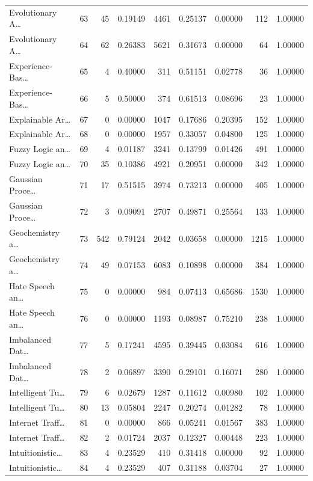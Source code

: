 \begin{table}
\begin{tabular}{lrrrrrrrr}
Evolutionary A… & 63 & 45 & 0.19149 & 4461 & 0.25137 & 0.00000 & 112 & 1.00000 \\
Evolutionary A… & 64 & 62 & 0.26383 & 5621 & 0.31673 & 0.00000 & 64 & 1.00000 \\
Experience-Bas… & 65 & 4 & 0.40000 & 311 & 0.51151 & 0.02778 & 36 & 1.00000 \\
Experience-Bas… & 66 & 5 & 0.50000 & 374 & 0.61513 & 0.08696 & 23 & 1.00000 \\
Explainable Ar… & 67 & 0 & 0.00000 & 1047 & 0.17686 & 0.20395 & 152 & 1.00000 \\
Explainable Ar… & 68 & 0 & 0.00000 & 1957 & 0.33057 & 0.04800 & 125 & 1.00000 \\
Fuzzy Logic an… & 69 & 4 & 0.01187 & 3241 & 0.13799 & 0.01426 & 491 & 1.00000 \\
Fuzzy Logic an… & 70 & 35 & 0.10386 & 4921 & 0.20951 & 0.00000 & 342 & 1.00000 \\
Gaussian Proce… & 71 & 17 & 0.51515 & 3974 & 0.73213 & 0.00000 & 405 & 1.00000 \\
Gaussian Proce… & 72 & 3 & 0.09091 & 2707 & 0.49871 & 0.25564 & 133 & 1.00000 \\
Geochemistry a… & 73 & 542 & 0.79124 & 2042 & 0.03658 & 0.00000 & 1215 & 1.00000 \\
Geochemistry a… & 74 & 49 & 0.07153 & 6083 & 0.10898 & 0.00000 & 384 & 1.00000 \\
Hate Speech an… & 75 & 0 & 0.00000 & 984 & 0.07413 & 0.65686 & 1530 & 1.00000 \\
Hate Speech an… & 76 & 0 & 0.00000 & 1193 & 0.08987 & 0.75210 & 238 & 1.00000 \\
Imbalanced Dat… & 77 & 5 & 0.17241 & 4595 & 0.39445 & 0.03084 & 616 & 1.00000 \\
Imbalanced Dat… & 78 & 2 & 0.06897 & 3390 & 0.29101 & 0.16071 & 280 & 1.00000 \\
Intelligent Tu… & 79 & 6 & 0.02679 & 1287 & 0.11612 & 0.00980 & 102 & 1.00000 \\
Intelligent Tu… & 80 & 13 & 0.05804 & 2247 & 0.20274 & 0.01282 & 78 & 1.00000 \\
Internet Traff… & 81 & 0 & 0.00000 & 866 & 0.05241 & 0.01567 & 383 & 1.00000 \\
Internet Traff… & 82 & 2 & 0.01724 & 2037 & 0.12327 & 0.00448 & 223 & 1.00000 \\
Intuitionistic… & 83 & 4 & 0.23529 & 410 & 0.31418 & 0.00000 & 92 & 1.00000 \\
Intuitionistic… & 84 & 4 & 0.23529 & 407 & 0.31188 & 0.03704 & 27 & 1.00000 \\

\end{tabular}
\end{table}
